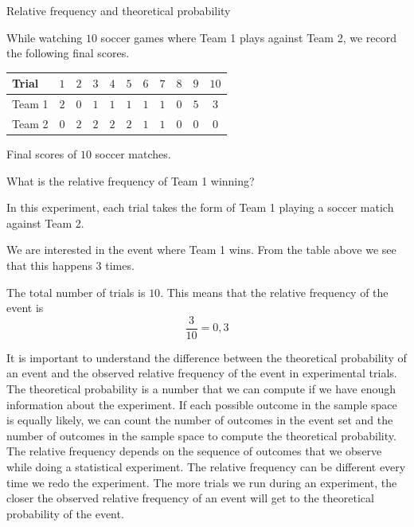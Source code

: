 \begin{wex}{Relative frequency and theoretical probability}{
  While watching $10$ soccer games where Team 1 plays against Team 2, we
  record the following final scores.
    \begin{center}
      \begin{tabular}{lcccccccccc}
        \toprule
        Trial  & $1$ & $2$ & $3$ & $4$ & $5$ & $6$ & $7$ & $8$ & $9$ & $10$ \\
        \midrule
        Team 1 & $2$ & $0$ & $1$ & $1$ & $1$ & $1$ & $1$ & $0$ & $5$ & $3$ \\
        Team 2 & $0$ & $2$ & $2$ & $2$ & $2$ & $1$ & $1$ & $0$ & $0$ & $0$ \\
        \bottomrule
      \end{tabular}\begin{center} Final scores of $10$ soccer matches. \end{center}

    \end{center}
      

What is the relative frequency of Team 1 winning?
}{
  In this experiment, each trial takes the form of Team 1 playing a
  soccer matich against Team 2.


  We are interested in the event where Team 1 wins. From the table
  above we see that this happens $3$ times.


  The total number of trials is $10$. This means that the relative
  frequency of the event is \[\frac{3}{10} = 0,3\]
}
\end{wex}

It is important to understand the difference between the theoretical
probability of an event and the observed relative frequency of the
event in experimental trials. The theoretical probability is a number
that we can compute if we have enough information about the
experiment. If each possible outcome in the sample space is
equally likely, we can count the number of outcomes in the event set
and the number of outcomes in the sample space to compute the
theoretical probability.\\

The relative frequency depends on the sequence of outcomes that we
observe while doing a statistical experiment. The relative frequency
can be different every time we redo the experiment. The more trials we
run during an experiment, the closer the observed relative frequency
of an event will get to the theoretical probability of the event.\\

